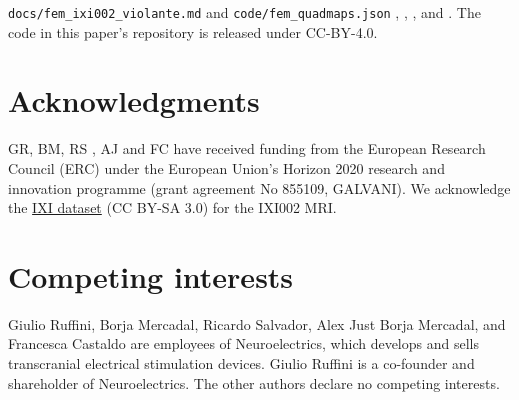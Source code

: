 \documentclass[11pt,a4paper]{article}
\newif\ifjne
\providecommand{\DIFaddtex}[1]{{\protect\color{blue} \sf #1}} %
\providecommand{\DIFdeltex}[1]{{\protect\color{red} \scriptsize #1}} %
\providecommand{\DIFaddbegin}{} %
\providecommand{\DIFaddend}{} %
\providecommand{\DIFdelbegin}{} %
\providecommand{\DIFdelend}{} %
\providecommand{\DIFadd}[1]{\texorpdfstring{\DIFaddtex{#1}}{#1}} %
\providecommand{\DIFdel}[1]{\texorpdfstring{\DIFdeltex{#1}}{}} %
\begin{document}
\DIFdelbegin \DIFdel{\texttt{docs/fem\_ixi002\_violante.md} and \texttt{code/fem\_quadmaps.json}}\DIFdelend \DIFaddbegin {}\DIFadd{, }\DIFadd{,
}\DIFadd{, and }\DIFaddend .
The code in this paper's repository is released under CC-BY-4.0.

\section*{Acknowledgments}
GR, BM, RS \DIFdelbegin \DIFdel{, AJ }\DIFdelend and FC have received funding from the European Research Council (ERC) under the
European Union's Horizon 2020 research and innovation programme (grant agreement No 855109,
GALVANI).
\DIFaddbegin \DIFadd{We acknowledge the }\href{https://brain-development.org/ixi-dataset/}{\DIFadd{IXI dataset}}
\DIFadd{(CC BY-SA 3.0) for the IXI002 MRI.
}\DIFaddend %

\ifjne
\section*{Competing interests}
Giulio Ruffini, \DIFdelbegin \DIFdel{Borja Mercadal, }\DIFdelend Ricardo Salvador, \DIFdelbegin \DIFdel{Alex Just}\DIFdelend \DIFaddbegin \DIFadd{Borja Mercadal}\DIFaddend , and Francesca Castaldo are employees of
Neuroelectrics, which develops and sells transcranial electrical stimulation devices.
Giulio Ruffini is a co-founder and shareholder of Neuroelectrics. The other authors
declare no competing interests.
\end{document}
